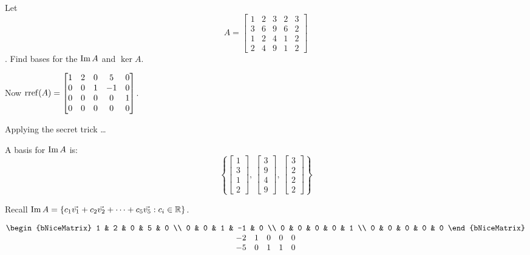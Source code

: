 \documentclass[../main.tex]{subfiles}
\begin{document}
\begin{example}[]
    Let \[ A = \begin{bmatrix}
        1 & 2 & 3 & 2 & 3 \\
        3 & 6 & 9 & 6 & 2 \\
        1 & 2 & 4 & 1 & 2 \\
        2 & 4 & 9 & 1 & 2
    \end{bmatrix} \]. Find bases for the \( \operatorname{Im} A \) and \( \ker A \).

    Now \( \operatorname{rref}(A) = \begin{bmatrix}
        1 & 2 & 0 & 5 & 0 \\
        0 & 0 & 1 & -1 & 0 \\
        0 & 0 & 0 & 0 & 1 \\
        0 & 0 & 0 & 0 & 0 
    \end{bmatrix} \).
    
    Applying the secret trick \dots

    A basis for \( \operatorname{Im} A \) is:
    \[ \left\{
        \begin{bmatrix} 1 \\ 3 \\ 1 \\ 2 \end{bmatrix}, \,
        \begin{bmatrix} 3 \\ 9 \\ 4 \\ 9 \end{bmatrix}, \,
        \begin{bmatrix} 3 \\ 2 \\ 2 \\ 2 \end{bmatrix}
    \right\} \]
    
    Recall \( \operatorname{Im} A = \left\{ c_1 \vec{v_1}+ c_2 \vec{v_2} + \dots + c_5 \vec{v_5} : c_i \in \mathbb{R} \right\} \).

    \[ \begin{matrix}
        \begin{bNiceMatrix}
            1 & 2 & 0 & 5 & 0 \\
            0 & 0 & 1 & -1 & 0 \\
            0 & 0 & 0 & 0 & 1 \\
            0 & 0 & 0 & 0 & 0
        \end{bNiceMatrix} \\
        \begin{matrix}
            -2 & 1 & 0 & 0 & 0 \\
            -5 & 0 & 1 & 1 & 0
        \end{matrix}
    \end{matrix}
    \]


\end{example}
\end{document}
